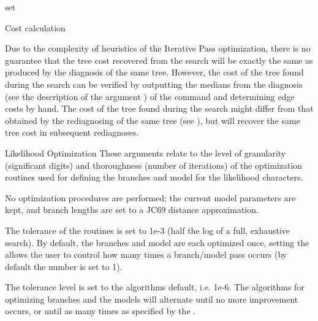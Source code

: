 \begin{command}{set}{}
\begin{arguments}
\begin{argumentgroup}{Cost calculation}
            \begin{statement}
                Due to the complexity of heuristics of the Iterative Pass
                optimization, there is no guarantee that the tree cost recovered
                from the search will be exactly the same as produced by the
                diagnosis of the same tree.  However, the cost of the tree found
                during the search can be verified by outputting the medians from
                the diagnosis (see the description of the argument
                ) of the command
                 and determining edge costs by hand. The cost
                of the tree found during the search might differ from that
                obtained by the rediagnosing of the same tree (see
                ), but will recover the same
                tree cost in subsequent rediagnoses. 
            \end{statement}
                           
        \end{argumentgroup}

        \begin{argumentgroup}{Likelihood Optimization}
            {These arguments relate to the level of granularity (significant digits)
            and thoroughness (number of iterations) of the optimization routines
            used for defining the branches and model for the likelihood characters.}

                {No optimization procedures are performed; the current model
                parameters are kept, and branch lengths are set to a JC69
                distance approximation.}
                {}

                {The tolerance of the routines is set to 1e-3 (half the
                log of a full, exhaustive search). By default, 
                the branches and model are each optimized once, 
                setting the \poyint allows the user to control how 
                many times a branch/model pass occurs
                (by default the number is set to 1).}
                {}

                {The tolerance level is set to the algorithms default, i.e. 1e-6. 
                The algorithms for optimizing branches and the models 
                will alternate until no more improvement occurs, or
                until as many times as specified by the \poyint.}
                {}


\end{argumentgroup}
\end{arguments}
\end{command}
